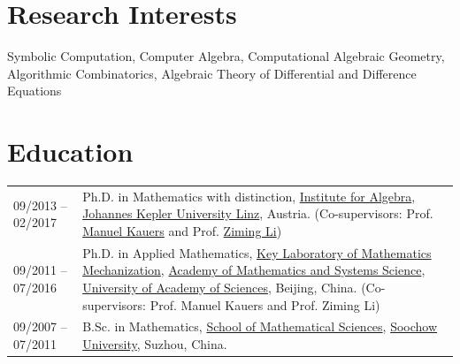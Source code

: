 \documentclass[a4paper,12pt]{article}
\begin{document}
\section*{\Large{Research Interests}}
Symbolic Computation, Computer Algebra, Computational Algebraic Geometry, Algorithmic Combinatorics, 
Algebraic Theory of Differential and Difference Equations

\section*{\Large{Education}}
\begin{tabular}{@{}p{1.4in}p{4in}}
09/2013 -- 02/2017    & Ph.D. in Mathematics with distinction, 
                        \href{http://www.jku.at/algebra/content}{Institute for Algebra}, 
                        \href{http://www.jku.at/content}{Johannes Kepler University Linz}, Austria. 
                        (Co-supervisors: Prof. \href{http://www.kauers.de/}{Manuel Kauers} and 
                        Prof. \href{http://mmrc.iss.ac.cn/~zmli/}{Ziming Li})\\
09/2011 -- 07/2016    & Ph.D. in Applied Mathematics, 
                        \href{http://english.mmrc.amss.cas.cn/}{Key Laboratory of Mathematics Mechanization}, 
                        \href{http://english.amss.cas.cn/}{Academy of Mathematics and Systems Science}, 
                        \href{http://english.ucas.ac.cn/}{University of Academy of Sciences}, Beijing, China. 
                        (Co-supervisors: Prof. Manuel Kauers and Prof. Ziming Li)\\
09/2007 -- 07/2011    & B.Sc. in Mathematics, \href{http://math.suda.edu.cn/}{School of Mathematical Sciences}, 
                        \href{http://eng.suda.edu.cn/}{Soochow University}, Suzhou, China.  
\end{tabular} \\

\end{document}
